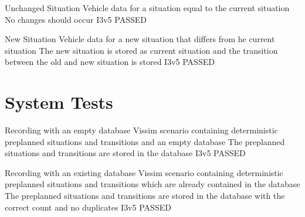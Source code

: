 \documentclass[a4paper, 11pt]{scrreprt}
\begin{document}
	{Unchanged Situation}
	{Vehicle data for a situation equal to the current situation}
	{No changes should occur}
	{I3v5}
	{PASSED}
	
	{New Situation}
	{Vehicle data for a new situation that differs from he current situation}
	{The new situation is stored as current situation and the transition between the old and new situation is stored}
	{I3v5}
	{PASSED}

\chapter{System Tests}
	
	{Recording with an empty database}
	{Vissim scenario containing deterministic preplanned situations and transitions and an empty database}
	{The preplanned situations and transitions are stored in the database}
	{I3v5}
	{PASSED}
	
	{Recording with an existing database}
	{Vissim scenario containing deterministic preplanned situations and transitions which are already contained in the database}
	{The preplanned situations and transitions are stored in the database with the correct count and no duplicates}
	{I3v5}
	{PASSED}
	
\end{document}
